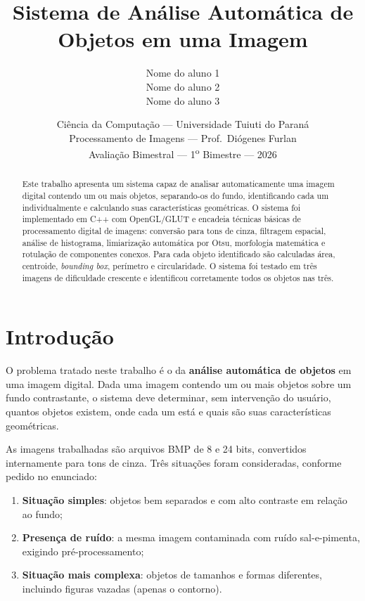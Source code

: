 \documentclass[12pt,a4paper]{article}
\title{\textbf{Sistema de Análise Automática de Objetos em uma Imagem}}
\author{%
  Nome do aluno 1 \\
  Nome do aluno 2 \\
  Nome do aluno 3
}
\date{Ciência da Computação --- Universidade Tuiuti do Paraná \\[2pt]
      Processamento de Imagens --- Prof.\ Diógenes Furlan \\[2pt]
      Avaliação Bimestral --- 1\textsuperscript{o} Bimestre --- 2026}
\begin{document}
\maketitle
\thispagestyle{empty}

\begin{abstract}
\noindent
Este trabalho apresenta um sistema capaz de analisar automaticamente uma
imagem digital contendo um ou mais objetos, separando-os do fundo,
identificando cada um individualmente e calculando suas características
geométricas. O sistema foi implementado em C++ com OpenGL/GLUT e encadeia
técnicas básicas de processamento digital de imagens: conversão para tons de
cinza, filtragem espacial, análise de histograma, limiarização automática por
Otsu, morfologia matemática e rotulação de componentes conexos. Para cada
objeto identificado são calculadas área, centroide, \emph{bounding box},
perímetro e circularidade. O sistema foi testado em três imagens de
dificuldade crescente e identificou corretamente todos os objetos nas três.
\end{abstract}

\tableofcontents
\newpage

\section{Introdução}

O problema tratado neste trabalho é o da \textbf{análise automática de
objetos} em uma imagem digital. Dada uma imagem contendo um ou mais objetos
sobre um fundo contrastante, o sistema deve determinar, sem intervenção do
usuário, quantos objetos existem, onde cada um está e quais são suas
características geométricas.

As imagens trabalhadas são arquivos BMP de 8 e 24 bits, convertidos
internamente para tons de cinza. Três situações foram consideradas, conforme
pedido no enunciado:

\begin{enumerate}
  \item \textbf{Situação simples}: objetos bem separados e com alto contraste
        em relação ao fundo;
  \item \textbf{Presença de ruído}: a mesma imagem contaminada com ruído
        sal-e-pimenta, exigindo pré-processamento;
  \item \textbf{Situação mais complexa}: objetos de tamanhos e formas
        diferentes, incluindo figuras vazadas (apenas o contorno).
\end{enumerate}
\end{document}
